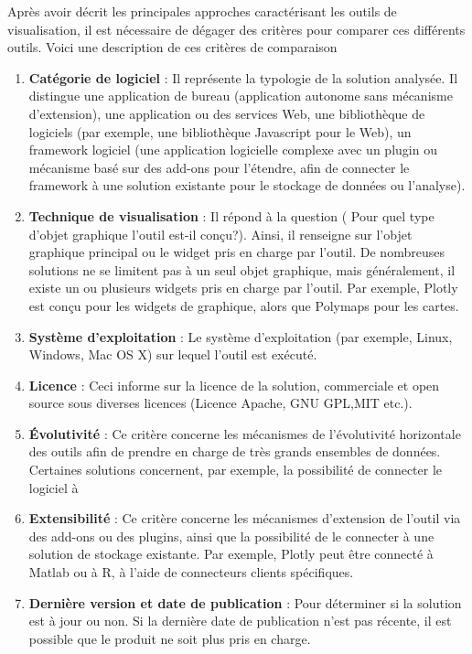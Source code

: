 \documentclass[french, a4paper, 12pt]{report}
\begin{document}
Après avoir décrit les principales approches caractérisant les outils de visualisation, il est nécessaire de dégager des critères pour comparer ces différents outils. Voici une description de ces critères de comparaison 
\begin{enumerate}
  \item \textbf {Catégorie de logiciel }: Il représente la typologie de la solution analysée. Il distingue une application de bureau (application autonome sans mécanisme d'extension), une application ou des services Web, une bibliothèque de logiciels (par exemple, une bibliothèque Javascript pour le Web), un framework logiciel (une application logicielle complexe avec un plugin ou mécanisme basé sur des add-ons pour l'étendre, afin de connecter le framework à une solution existante pour le stockage de données ou l'analyse). 
  \item \textbf {Technique de visualisation } : Il répond à la question ( Pour quel type d’objet graphique l’outil est-il conçu?). Ainsi, il renseigne sur l'objet graphique principal ou le widget pris en charge par l'outil. De nombreuses solutions ne se limitent pas à un seul objet graphique, mais généralement, il existe un ou plusieurs widgets pris en charge par l’outil. Par exemple, Plotly est conçu pour les widgets de graphique, alors que Polymaps pour les cartes.
  \item \textbf {Système d'exploitation} : Le système d'exploitation (par exemple, Linux, Windows, Mac OS X) sur lequel l'outil est exécuté.
  \item \textbf {Licence} : Ceci informe sur la licence de la solution, commerciale et open source sous diverses licences (Licence Apache, GNU GPL,MIT etc.).
  \item \textbf {Évolutivité } : Ce critère concerne les mécanismes de l’évolutivité horizontale des outils afin de prendre en charge de très grands ensembles de données. Certaines solutions concernent, par exemple, la possibilité de connecter le logiciel à 
  \item \textbf {Extensibilité} : Ce critère concerne les mécanismes d'extension de l'outil via des add-ons ou des plugins, ainsi que la possibilité de le connecter à une solution de stockage existante. Par exemple, Plotly peut être connecté à Matlab ou à R, à l’aide de connecteurs clients spécifiques. 
  \item \textbf {Dernière version et date de publication} : Pour déterminer si la solution est à jour ou non. Si la dernière date de publication n'est pas récente, il est possible que le produit ne soit plus pris en charge.
\end{enumerate}
\end{document}
